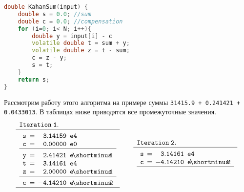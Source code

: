 \documentclass{article}
\theoremstyle{definition}
\begin{document}
\begin{multicols}{2}
\begin{minipage}{0.48\textwidth}
\begin{lstlisting}[language=C++]
double KahanSum(input) {
    double s = 0.0; //sum
    double c = 0.0; //compensation
    for (i=0; i< N; i++){
        double y = input[i] - c
        volatile double t = sum + y;
        volatile double z = t - sum;
        c = z - y;
        s = t;
    }
    return s;
}
\end{lstlisting}
\end{minipage} \vfill\null\columnbreak\noindent
Рассмотрим работу этого алгоритма на примере суммы \verb_31415.9 + 0.241421 + 0.0433013_. В таблицах ниже приводятся все промежуточные значения.
\begin{equation*}
\begin{array}{l}
\mathtt{Iteration\; 1.} \\ \hline \\[-8pt]
\begin{array}{l l l}
\mathtt{s} \!\!\!\!\!\!\!& \mathtt{=\, \phantom{-} 3.14159} & \!\!\!\mathtt{e4} \\
\mathtt{c} \!\!\!\!\!\!\!& \mathtt{=\, \phantom{-}0.00000} & \!\!\!\mathtt{e0} \\ \hline \\[-8pt]
\mathtt{y} \!\!\!\!\!\!\!& \mathtt{=\, \phantom{-}2.41421} & \!\!\!\mathtt{e\!\shortminus\!\!1} \\
\mathtt{t} \!\!\!\!\!\!\!& \mathtt{=\, \phantom{-}3.14161} & \!\!\!\mathtt{e4} \\
\mathtt{z} \!\!\!\!\!\!\!& \mathtt{=\, \phantom{-}2.00000} & \!\!\!\mathtt{e\!\shortminus\!\!1} \\ \hline\\[-8pt]
\mathtt{c} \!\!\!\!\!\!\!& \mathtt{=\, -4.14210} & \!\!\!\mathtt{e\!\shortminus\!\!2}
\end{array} \\[8pt] \hline
\end{array} \qquad 
\begin{array}{l}
\mathtt{Iteration\; 2.} \\ \hline \\[-8pt]
\begin{array}{l l l}
\mathtt{s} \!\!\!\!\!\!\!& \mathtt{=\, \phantom{-}3.14161} & \!\!\!\mathtt{e4} \\
\mathtt{c} \!\!\!\!\!\!\!& \mathtt{=\, -4.14210} & \!\!\!\mathtt{e\!\shortminus\!\!2} \\ \hline \\[-8pt]

\end{array}
\end{array}
\end{equation*}
\end{multicols}
\end{document}
